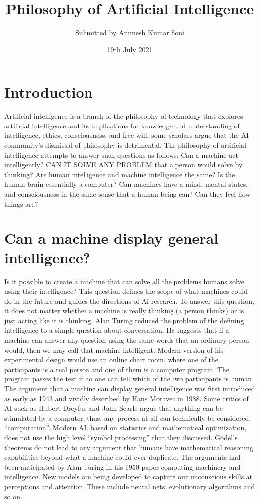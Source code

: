 \documentclass{article}
\title{Philosophy of Artificial Intelligence}
\author{Submitted by Animesh Kumar Soni}
\date{19th July 2021}
\begin{document}
\maketitle

\section{Introduction}
Artificial intelligence is a branch of the philosophy of technology that explores artificial intelligence and its implications for knowledge and understanding of intelligence, ethics, consciousness, and free will. some scholars argue that the AI community’s dismissal of philosophy is detrimental. The philosophy of artificial intelligence attempts to answer such questions as follows: Can a machine act intelligently? CAN IT SOLVE ANY PROBLEM that a person would solve by thinking? Are human intelligence and machine intelligence the same?
Is the human brain essentially a computer? Can machines have a mind, mental states, and consciousness in the same sense that a human being can? Can they feel how things are?
\section{Can a machine display general intelligence? }
Is it possible to create a machine that can solve all the problems humans solve using their intelligence? This question defines the scope of what machines could do in the future and guides the directions of Ai research. To answer this question, it does not matter whether a machine is really thinking (a person thinks) or is just acting like it is thinking.
Alan Turing reduced the problem of the defining intelligence to a simple question about conversation. He suggests that if a machine can answer any question using the same words that an ordinary person would, then we may call that machine intelligent. Modern version of his experimental design would use an online chart room, where one of the participants is a real person and one of them is a computer program. The program passes the test if no one can tell which of the two participants is human.
The argument that a machine can display general intelligence was first introduced as early as 1943 and vividly described by Hans Moravec in 1988. Some critics of AI such as Hubert Dreyfus and John Searle argue that anything can be stimulated by a computer; thus, any process at all can technically be considered “computation”.
Modern AI, based on statistics and mathematical optimization, does not use the high level “symbol processing” that they discussed. Gödel’s theorems do not lead to any argument that humans have mathematical reasoning capabilities beyond what a machine could ever duplicate. The arguments had been anticipated by Alan Turing in his 1950 paper computing machinery and intelligence. New models are being developed to capture our unconscious skills at perceptions and attention. These include neural nets, evolutionary algorithms and so on.
\end{document}
